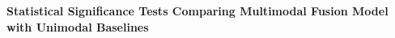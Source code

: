 \documentclass[10pt,letterpaper]{article}
\begin{document}
                                                                                                                          \begin{table}[!t]
                                                                                                                          \begin{adjustwidth}{-2.25in}{0in}
                                                                                                                          \centering
                                                                                                                          \caption{\textbf{Statistical Significance Tests Comparing Multimodal Fusion Model with Unimodal Baselines}}
                                                                                                                          \label{tab:stat_tests}
                                                                                                                          \footnotesize
                                                                                                                          \renewcommand{\arraystretch}{1.3}
                                                                                                                          

\end{adjustwidth}
\end{table}
\end{document}
